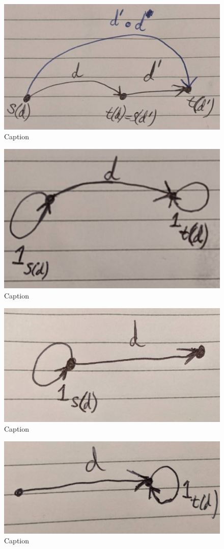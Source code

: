 \begin{figure}
    \centering
    \includegraphics[width=0.5\linewidth]{2MathematicalFramework/InitialFramework/Images/transformation_composition.jpg}
    \caption{Caption}
    \label{fig:transformation_composition}
\end{figure}

\begin{figure}
    \centering
    \includegraphics[width=0.5\linewidth]{2MathematicalFramework/InitialFramework/Images/trivial_transformations_example_all_transformations.jpg}
    \caption{Caption}
    \label{fig:trivial_transformations_example_all_transformations}
\end{figure}

\begin{figure}
    \centering
    \includegraphics[width=0.5\linewidth]{2MathematicalFramework/InitialFramework/Images/right_trivial_transformation.jpg}
    \caption{Caption}
    \label{fig:right_trivial_transformation}
\end{figure}

\begin{figure}
    \centering
    \includegraphics[width=0.5\linewidth]{2MathematicalFramework/InitialFramework/Images/left_trivial_transformation.jpg}
    \caption{Caption}
    \label{fig:left_trivial_transformation}
\end{figure}



